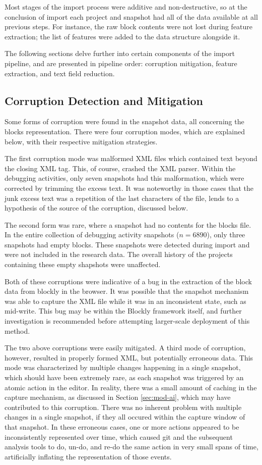 Most stages of the import process were additive and non-destructive, so at the conclusion of import each project and snapshot had all of the data available at all previous steps. For instance, the raw block contents were not lost during feature extraction; the list of features were added to the data structure alongside it. 

The following sections delve further into certain components of the import pipeline, and are presented in pipeline order: corruption mitigation, feature extraction, and text field reduction.


\subsection{Corruption Detection and Mitigation}
Some forms of corruption were found in the snapshot data, all concerning the blocks representation. There were four corruption modes, which are explained below, with their respective mitigation strategies.

The first corruption mode was malformed XML files which contained text beyond the closing XML tag. This, of course, crashed the XML parser. Within the debugging activities, only seven snapshots had this malformation, which were corrected by trimming the excess text. It was noteworthy in those cases that the junk excess text was a repetition of the last characters of the file, lends to a hypothesis of the source of the corruption, discussed below.

The second form was rare, where a snapshot had no contents for the blocks file. In the entire collection of debugging activity snapshots ($n = 6890$), only three snapshots had empty blocks. These snapshots were detected during import and were not included in the research data. The overall history of the projects containing these empty shapshots were unaffected. 

Both of these corruptions were indicative of a bug in the extraction of the block data from blockly in the browser. It was possible that the snapshot mechanism was able to capture the XML file while it was in an inconsistent state, such as mid-write. This bug may be within the Blockly framework itself, and further investigation is recommended before attempting larger-scale deployment of this method.

The two above corruptions were easily mitigated. A third mode of corruption, however, resulted in properly formed XML, but potentially erroneous data. This mode was characterized by multiple changes happening in a single snapshot, which should have been extremely rare, as each snapshot was triggered by an atomic action in the editor. In reality, there was a small amount of caching in the capture mechanism, as discussed in Section \ref{sec:mod-ai}, which may have contributed to this corruption. There was no inherent problem with multiple changes in a single snapshot, if they all occured within the capture window of that snapshot. In these erroneous cases, one or more actions appeared to be inconsistently represented over time, which caused git and the subsequent analysis tools to do, un-do, and re-do the same action in very small spans of time, artificially inflating the representation of those events. 

